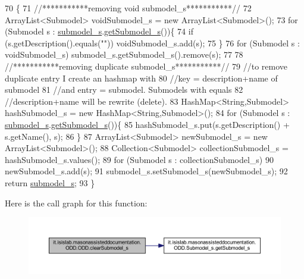 \begin{DoxyCode}
70                                                 \{
71         \textcolor{comment}{//***********removing void submodel\_s***********//}
72         ArrayList<Submodel> voidSubmodel\_s = \textcolor{keyword}{new} ArrayList<Submodel>();
73         \textcolor{keywordflow}{for} (Submodel s : \hyperlink{classit_1_1isislab_1_1masonassisteddocumentation_1_1_o_d_d_1_1_o_d_d_a828127e4a115a98ea6e6dba0a637c9ff}{submodel\_s}.\hyperlink{classit_1_1isislab_1_1masonassisteddocumentation_1_1_o_d_d_1_1_submodel__s_af835b4d42da6393b22f991b79ea32236}{getSubmodel\_s}())\{
74             \textcolor{keywordflow}{if} (s.getDescription().equals(\textcolor{stringliteral}{""}))  voidSubmodel\_s.add(s);
75         \}
76         \textcolor{keywordflow}{for} (Submodel s : voidSubmodel\_s)   submodel\_s.getSubmodel\_s().\textcolor{keyword}{remove}(s);
77         
78         \textcolor{comment}{//***********removing duplicate submodel\_s***********//}
79         \textcolor{comment}{//to remove duplicate entry I create an hashmap with }
80         \textcolor{comment}{//key = description+name of submodel}
81         \textcolor{comment}{//and entry = submodel. Submodels with equals }
82         \textcolor{comment}{//description+name will be rewrite (delete).}
83         HashMap<String,Submodel> hashSubmodel\_s = \textcolor{keyword}{new} HashMap<String,Submodel>();
84         \textcolor{keywordflow}{for} (Submodel s : \hyperlink{classit_1_1isislab_1_1masonassisteddocumentation_1_1_o_d_d_1_1_o_d_d_a828127e4a115a98ea6e6dba0a637c9ff}{submodel\_s}.\hyperlink{classit_1_1isislab_1_1masonassisteddocumentation_1_1_o_d_d_1_1_submodel__s_af835b4d42da6393b22f991b79ea32236}{getSubmodel\_s}())\{
85             hashSubmodel\_s.put(s.getDescription() + s.getName(), s);
86         \}
87         ArrayList<Submodel> newSubmodel\_s = \textcolor{keyword}{new} ArrayList<Submodel>();
88         Collection<Submodel> collectionSubmodel\_s = hashSubmodel\_s.values();
89         \textcolor{keywordflow}{for} (Submodel s : collectionSubmodel\_s)
90             newSubmodel\_s.add(s);
91         submodel\_s.setSubmodel\_s(newSubmodel\_s);
92         \textcolor{keywordflow}{return} \hyperlink{classit_1_1isislab_1_1masonassisteddocumentation_1_1_o_d_d_1_1_o_d_d_a828127e4a115a98ea6e6dba0a637c9ff}{submodel\_s};
93     \}
\end{DoxyCode}


Here is the call graph for this function\-:
\nopagebreak
\begin{figure}[H]
\begin{center}
\leavevmode
\includegraphics[width=350pt]{classit_1_1isislab_1_1masonassisteddocumentation_1_1_o_d_d_1_1_o_d_d_a40cc43dbe2785cabf2ffc7adba8854ea_cgraph}
\end{center}
\end{figure}




